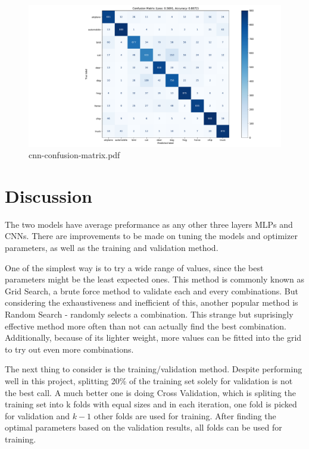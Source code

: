 \documentclass{report}
\begin{document}
\begin{figure}[ht!]
    \center
    \includegraphics[scale=0.405]{../output/cnn-confusion-matrix.pdf}
    \caption{cnn-confusion-matrix.pdf}
\end{figure}

\newpage
\section{Discussion}
The two models have average preformance as any other three layers MLPs and CNNs. There are improvements 
to be made on tuning the models and optimizer parameters, as well as the training and validation method. 

One of the simplest way is to try a wide range of values, since the best parameters might be the least 
expected ones. This method is commonly known as Grid Search, a brute force method to validate each and 
every combinations. But considering the exhaustiveness and inefficient of this, another popular method is 
Random Search - randomly selects a combination. This strange but suprisingly effective method more often 
than not can actually find the best combination. Additionally, because of its lighter weight, more values
can be fitted into the grid to try out even more combinations.

The next thing to consider is the training/validation method. Despite performing well in this project, splitting 20\%
of the training set solely for validation is not the best call. A much better one is doing Cross Validation, 
which is spliting the training set into k folds with equal sizes and in each iteration, one fold is picked for
validation and $k-1$ other folds are used for training. After finding the optimal parameters based on the validation results,
all folds can be used for training.
\end{document}
